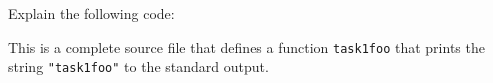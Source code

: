 Explain the following code:



\begin{solution}
    This is a complete source file that defines a function \lstinline{task1foo}
    that prints the string \lstinline{"task1foo"} to the standard output.
\end{solution}
